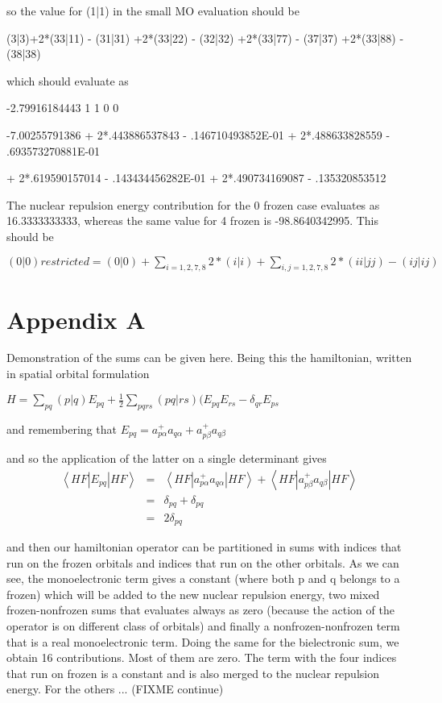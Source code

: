 \documentclass[a4paper,11pt]{report}
\begin{document}
so the value for (1|1) in the small MO evaluation should be

(3|3)+2*(33|11) - (31|31)
     +2*(33|22) - (32|32)
     +2*(33|77) - (37|37)
     +2*(33|88) - (38|38)

which should evaluate as 

 -2.79916184443      1  1  0  0



 -7.00255791386 + 2*.443886537843 - .146710493852E-01
                + 2*.488633828559 - .693573270881E-01

                + 2*.619590157014 - .143434456282E-01
                + 2*.490734169087 - .135320853512




The nuclear repulsion energy contribution for the 0 frozen case evaluates
as 16.3333333333, whereas the same value for 4 frozen is -98.8640342995.
This should be

$
(0|0) restricted = (0|0) + \sum_{i=1,2,7,8} 2*(i|i) + \sum_{i,j=1,2,7,8} 2*(ii|jj) - (ij|ij)
$


\section{Appendix A}

Demonstration of the sums can be given here.
Being this the hamiltonian, written in spatial orbital formulation

$
H = \sum_{pq} (p|q) E_{pq} + \frac{1}{2} \sum_{pqrs} (pq|rs) (E_{pq}E_{rs} -
\delta_{qr} E_{ps}
$

and remembering that
$
E_{pq} = a^{+}_{p\alpha}a_{q\alpha} + a^{+}_{p\beta}a_{q\beta}
$

and so the application of the latter on a single determinant gives
\begin{eqnarray}
\left< HF \left| E_{pq} \right| HF \right> & = & \left< HF \left|
a^{+}_{p\alpha}a_{q\alpha} \right| HF \right> + \left< HF \left|
a^{+}_{p\beta}a_{q\beta} \right| HF \right> \\
& = & \delta_{pq} + \delta_{pq} \\
& = & 2 \delta_{pq} 
\end{eqnarray}

and then our hamiltonian operator can be partitioned in sums with indices
that run on the frozen orbitals and indices that run on the other orbitals.
As we can see, the monoelectronic term gives a constant (where both p and q
belongs to a frozen) which will be added to the new nuclear repulsion energy,
two mixed frozen-nonfrozen sums that evaluates always as zero
(because the action of the operator is on different class of orbitals) and
finally a nonfrozen-nonfrozen term that is a real monoelectronic term.
Doing the same for the bielectronic sum, we obtain 16 contributions. Most of
them are zero. The term with the four indices that run on frozen is a
constant and is also merged to the nuclear repulsion energy.
For the others ... (FIXME continue)
\end{document}

